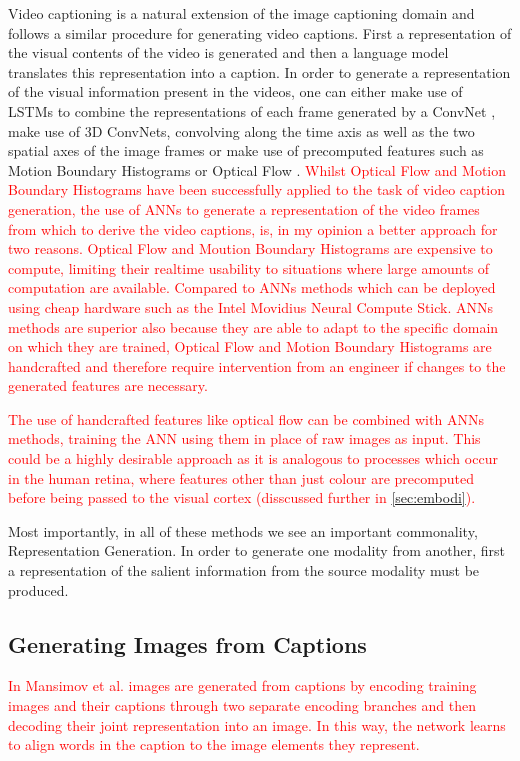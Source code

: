 Video captioning is a natural extension of the image captioning domain and follows a similar procedure for generating video captions. First a representation of the visual contents of the video is generated and then a language model translates this representation into a caption. In order to generate a representation of the visual information  present in the videos, one can either make use of \acp{LSTM} to combine the representations of each frame generated by a \ac{ConvNet} \cite{donahue2015long}, make use of 3D \acp{ConvNet}, convolving along the time axis as well as the two spatial axes of the image frames \cite{yao2015describing, yao2015video} or make use of precomputed features such as Motion Boundary Histograms or Optical Flow \cite{rohrbach2014coherent, rohrbach2013translating}.
\textcolor{red}{Whilst Optical Flow and Motion Boundary Histograms have been successfully applied to the task of video caption generation, the use of \acp{ANN} to generate a representation of the video frames from which to derive the video captions, is, in my opinion a better approach for two reasons. Optical Flow and Moution Boundary Histograms are expensive to compute, limiting their realtime usability to situations where large amounts of computation are available. Compared to \acp{ANN} methods which can be deployed using cheap hardware such as the Intel Movidius Neural Compute Stick. \acp{ANN} methods are superior also because they are able to adapt to the specific domain on which they are trained, Optical Flow and Motion Boundary Histograms are handcrafted and therefore require intervention from an engineer if changes to the generated features are necessary.}

\textcolor{red}{The use of handcrafted features like optical flow can be combined with \acp{ANN} methods, training the \ac{ANN} using them in place of raw images as input. This could be a highly desirable approach as it is analogous to processes which occur in the human retina, where features other than just colour are precomputed before being passed to the visual cortex (disscussed further in \autoref{sec:embodi}).}

Most importantly, in all of these methods we see an important commonality, Representation Generation. In order to generate one modality from another, first a representation of the salient information from the source modality must be produced.

\subsection{Generating Images from Captions}
\textcolor{red}{In \cite{mansimov2015generating} Mansimov et al. images are generated from captions by encoding training images and their captions through two separate encoding branches and then decoding their joint representation into an image. In this way, the network learns to align words in the caption to the image elements they represent.}

